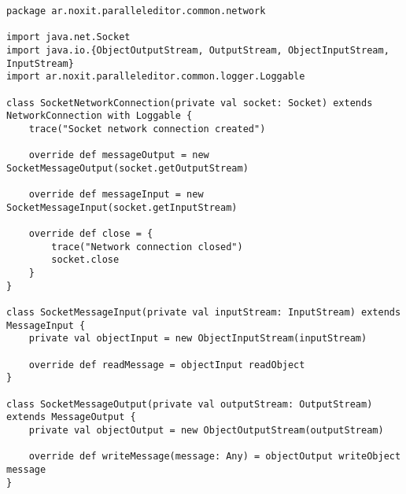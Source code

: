 {
\tiny
\begin{verbatim}
package ar.noxit.paralleleditor.common.network

import java.net.Socket
import java.io.{ObjectOutputStream, OutputStream, ObjectInputStream, InputStream}
import ar.noxit.paralleleditor.common.logger.Loggable

class SocketNetworkConnection(private val socket: Socket) extends NetworkConnection with Loggable {
    trace("Socket network connection created")

    override def messageOutput = new SocketMessageOutput(socket.getOutputStream)

    override def messageInput = new SocketMessageInput(socket.getInputStream)

    override def close = {
        trace("Network connection closed")
        socket.close
    }
}

class SocketMessageInput(private val inputStream: InputStream) extends MessageInput {
    private val objectInput = new ObjectInputStream(inputStream)

    override def readMessage = objectInput readObject
}

class SocketMessageOutput(private val outputStream: OutputStream) extends MessageOutput {
    private val objectOutput = new ObjectOutputStream(outputStream)

    override def writeMessage(message: Any) = objectOutput writeObject message
}\end{verbatim}
}